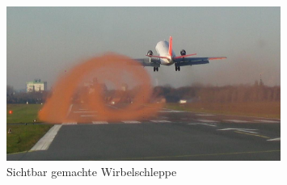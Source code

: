 \begin{figure}
\centering
\includegraphics[width=0.8\textwidth]{papers/wirbelringe/fig/visualisierung_einer_wirbelschleppe.jpg}
\caption{Sichtbar gemachte Wirbelschleppe 
\cite{Wirbelringe:visualisierung_einer_wirbelschleppe} \label{buch:papers:Wirbelringe:fig:visualisierung_einer_wirbelschleppe}}
\end{figure}